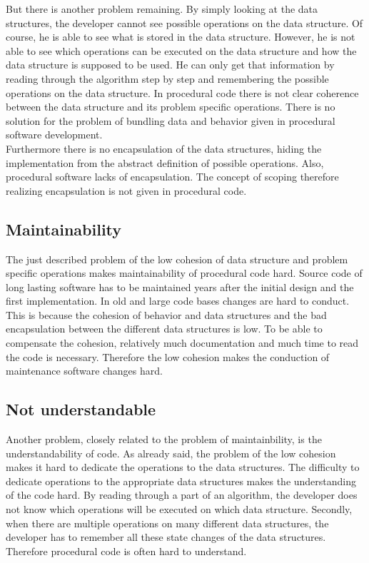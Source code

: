 But there is another problem remaining. By simply looking at the data structures, the developer cannot see possible operations on the data structure. Of course, he is able to see what is stored in the data structure. However, he is not able to see which operations can be executed on the data structure and how the data structure is supposed to be used. He can only get that information by reading through the algorithm step by step and remembering the possible operations on the data structure. In procedural code there is not clear coherence between the data structure and its problem specific operations. There is no solution for the problem of bundling data and behavior given in procedural software development. \\

Furthermore there is no encapsulation of the data structures, hiding the implementation from the abstract definition of possible operations. Also, procedural software lacks of encapsulation. The concept of scoping therefore realizing encapsulation is not given in procedural code. 

\subsection*{Maintainability}
\label{problem:maintainability}
The just described problem of the low cohesion of data structure and problem specific operations makes maintainability of procedural code hard. Source code of long lasting software has to be maintained years after the initial design and the first implementation. In old and large code bases changes are hard to conduct. This is because the cohesion of behavior and data structures and the bad encapsulation between the different data structures is low. To be able to compensate the cohesion, relatively much documentation and much time to read the code is necessary. Therefore the low cohesion makes the conduction of maintenance software changes hard. 

\subsection*{Not understandable}
Another problem, closely related to the problem of maintainbility, is the understandability of code. As already said, the problem of the low cohesion makes it hard to dedicate the operations to the data structures. The difficulty to dedicate operations to the appropriate data structures makes the understanding of the code hard. By  reading through a part of an algorithm, the developer does not know which operations will be executed on which data structure. Secondly, when there are multiple operations on many different data structures, the developer has to remember all these state changes of the data structures. Therefore procedural code is often hard to understand. 

